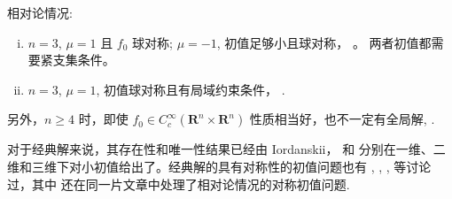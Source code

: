 相对论情况:
\begin{enumerate}[(i)]
    \item $n=3$, $\mu=1$ 且 $f_0$ 球对称; $\mu=-1$, 初值足够小且球对称， \cite*{glassey_symmetric_1985}。 两者初值都需要紧支集条件。
    \item $n=3$, $\mu=1$, 初值球对称且有局域约束条件， \cite*{wang2003global}. 
\end{enumerate}




另外，$n \geqslant 4 $ 时，即使 $f_0 \in C_{c}^{\infty} \left(\mathbf{R}^{n} \times \mathbf{R}^{n}\right)$ 性质相当好，也不一定有全局解, \cite*{HorstClasssicalII}.



对于经典解来说，其存在性和唯一性结果已经由 Iordanskii， \cite*{ukai1978classical} 和 \cite*{bardos1985global} 分别在一维、二维和三维下对小初值给出了。经典解的具有对称性的初值问题也有 \cite*{batt1977global}, \cite*{wollman-1980-symmetric}, \cite*{HorstClasssicalI}, \cite*{schaeffer1987global} 等讨论过，其中 \cite*{schaeffer1987global} 还在同一片文章中处理了相对论情况的对称初值问题.


